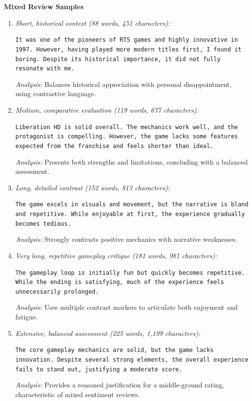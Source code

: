 \textbf{Mixed Review Samples}

\begin{enumerate}
    \item \textit{Short, historical context (88 words, 451 characters):}

    \texttt{It was one of the pioneers of RTS games and highly innovative in 1997. However, having played more modern titles first, I found it boring. Despite its historical importance, it did not fully resonate with me.}

    \textit{Analysis:} Balances historical appreciation with personal disappointment, using contrastive language.

    \item \textit{Medium, comparative evaluation (119 words, 677 characters):}

    \texttt{Liberation HD is solid overall. The mechanics work well, and the protagonist is compelling. However, the game lacks some features expected from the franchise and feels shorter than ideal.}

    \textit{Analysis:} Presents both strengths and limitations, concluding with a balanced assessment.

    \item \textit{Long, detailed contrast (152 words, 813 characters):}

    \texttt{The game excels in visuals and movement, but the narrative is bland and repetitive. While enjoyable at first, the experience gradually becomes tedious.}

    \textit{Analysis:} Strongly contrasts positive mechanics with narrative weaknesses.

    \item \textit{Very long, repetitive gameplay critique (181 words, 981 characters):}

    \texttt{The gameplay loop is initially fun but quickly becomes repetitive. While the ending is satisfying, much of the experience feels unnecessarily prolonged.}

    \textit{Analysis:} Uses multiple contrast markers to articulate both enjoyment and fatigue.

    \item \textit{Extensive, balanced assessment (225 words, 1{,}199 characters):}

    \texttt{The core gameplay mechanics are solid, but the game lacks innovation. Despite several strong elements, the overall experience fails to stand out, justifying a moderate score.}

    \textit{Analysis:} Provides a reasoned justification for a middle-ground rating, characteristic of mixed sentiment reviews.
\end{enumerate}


